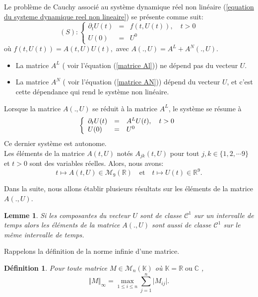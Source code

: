 \documentclass[12pt,a4paper,openany,oneside]{book}
\newtheorem{lemma}{Lemme}[chapter]
\newtheorem{definition}{Définition}[chapter]
\begin{document}
{{{{{{Le problème de Cauchy associé au système dynamique réel non linéaire (\ref{equation du systeme dynamique reel non lineaire}) se présente comme suit: 
\begin{equation}\label{PC1}
(S):\left\{\begin{array}{lll}
\partial_{t}U(t) & = & \mbox{$f(t,U(t)),\quad t>0$}\\
U(0) & = & U^{0}
\end{array}\right.
\end{equation}
où $f(t,U(t))= A(t,U)U(t),$ avec $ A(.,U)= A^{L}+ A^{N}(.,U)$.
\begin{itemize}
\item La matrice $ A^{L}$ ( voir l'équation (\ref{matrice Al})) ne dépend pas du vecteur $U$.
\item La matrice $ A^{N}$ ( voir l'équation (\ref{matrice AN})) dépend du vecteur $U$, et c'est cette dépendance qui rend le système non linéaire.
\end{itemize}

Lorsque la matrice $ A(.,U)$ se réduit à la matrice $ A^{L}$, le système se résume à
$$
\left\{\begin{array}{lll}
\partial_{t}U(t) & = & \mbox{$ A^{L}U(t),\quad t>0$}\\
U(0) & = & U^{0}
\end{array}\right.
$$
Ce dernier système est autonome.\\

Les éléments de la matrice $A(t,U)$ notés  \mbox{$A_{jk}(t,U)$} pour tout $ j,k \in \{1,2,\cdots9\}$ et $ t> 0$ sont des variables réelles. Alors, nous avons:
$$ t \mapsto A(t,U)\in \mathcal{M}_{9}(\mathbb{R})\quad \textrm{et} \quad t \mapsto U(t)\in \mathbb{R}^{9}.$$

Dans la suite, nous allons établir plusieurs résultats sur les éléments de la matrice $ A(.,U) $.

\begin{lemma}\label{lemme classe c1}
Si les composantes du vecteur $ U $ sont de classe $ \mathcal{C}^{1}$ sur un intervalle de temps alors les éléments de la matrice $A(.,U) $ sont aussi de classe $\mathcal{C}^{1}$ sur le même intervalle de temps.
\end{lemma}

Rappelons la définition de la norme infinie d'une matrice.
\begin{definition}
Pour toute matrice $ M\in \mathcal{M}_{n}(\mathbb{K}) $ où $ \mathbb{K}=\mathbb{R}\; \textrm{ou}\; \mathbb{C}$ ,
$$ \Vert M \Vert_{\infty} = \max_{1\leq i \leq n}\sum_{j=1}^{n}\vert M_{ij}\vert .$$
\end{definition}

}}}}}}
\end{document}
